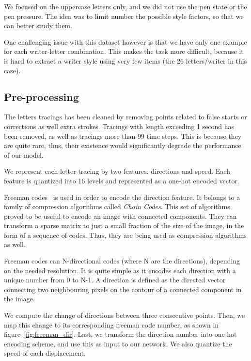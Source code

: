 \documentclass[conference]{IEEEtran}
\begin{document}
\par We focused on the uppercase letters only, and we did not use the pen state or the pen pressure. The idea was to limit number the possible style factors, so that we can better study them.

\par One challenging issue with this dataset however is that we have only one example for each writer-letter combination. This makes the task more difficult, because it is hard to extract a writer style using very few items (the 26 letters/writer in this case).

\subsection{Pre-processing} \label{sec:preprocessing}


\par The letters tracings has been cleaned by removing points related to false starts or corrections as well extra strokes. Tracings with length exceeding 1 second has been removed, as well as tracings more than 99 time steps. This is because they are quite rare, thus, their existence would significantly degrade the performance of our model.

\par We represent each letter tracing by two features: directions and speed. Each feature is quantized into 16 levels and represented as a one-hot encoded vector.

\par Freeman codes~\cite{freeman1961encoding} is used in order to encode the direction feature. It belongs to a family of compression algorithms called \textit{Chain Codes}. This set of algorithms proved to be useful to encode an image with connected components. They can transform a sparse matrix to just a small fraction of the size of the image, in the form of a sequence of codes. Thus, they are being used as compression algorithms as well.

\par Freeman codes can N-directional codes (where N are the directions), depending on the needed resolution. It is quite simple as it encodes each direction with a unique number from 0 to N-1. A direction is defined as the directed vector connecting two neighbouring pixels on the contour of a connected component in the image.

\par We compute the change of directions between three consecutive points. Then, we map this change to its corresponding freeman code number, as shown in figure~\ref{fig:freeman_dir}. Last, we transform the direction number into one-hot encoding scheme, and use this as input to our network. We also quantize the speed of each displacement.
\end{document}
